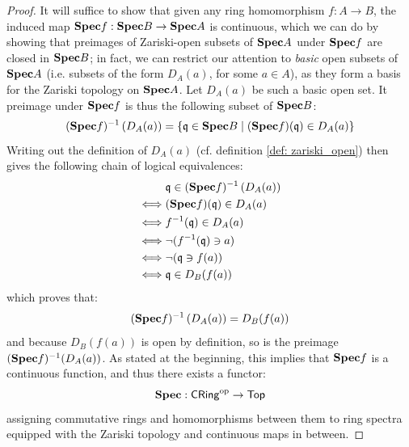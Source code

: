                    \begin{proof}
                        It will suffice to show that given any ring homomorphism $f: A \to B$, the induced map $\mathbf{Spec} f: \mathbf{Spec} B \to \mathbf{Spec} A$ is continuous, which we can do by showing that preimages of Zariski-open subsets of $\mathbf{Spec} A$ under $\mathbf{Spec} f$ are closed in $\mathbf{Spec} B$; in fact, we can restrict our attention to \textit{basic} open subsets of $\mathbf{Spec} A$ (i.e. subsets of the form $D_A(a)$, for some $a \in A$), as they form a basis for the Zariski topology on $\mathbf{Spec} A$. Let $D_A(a)$ be such a basic open set. It preimage under $\mathbf{Spec} f$ is thus the following subset of $\mathbf{Spec} B$:
                            $$(\mathbf{Spec} f)^{-1}\left(D_A(a)\right) = \{\mathfrak{q} \in \mathbf{Spec} B \mid (\mathbf{Spec} f)(\mathfrak{q}) \in D_A(a)\}$$
                        Writing out the definition of $D_A(a)$ (cf. definition \ref{def: zariski_open}) then gives the following chain of logical equivalences:
                            $$
                                \begin{aligned}
                                    & \mathfrak{q} \in (\mathbf{Spec} f)^{-1}\left(D_A(a)\right)
                                    \\
                                    \iff & (\mathbf{Spec} f)(\mathfrak{q}) \in D_A(a)
                                    \\
                                    \iff & f^{-1}(\mathfrak{q}) \in D_A(a)
                                    \\
                                    \iff & \neg(f^{-1}(\mathfrak{q}) \ni a)
                                    \\
                                    \iff & \neg(\mathfrak{q} \ni f(a))
                                    \\
                                    \iff & \mathfrak{q} \in D_B(f(a))
                                \end{aligned}
                            $$
                        which proves that:
                            $$(\mathbf{Spec} f)^{-1}\left(D_A(a)\right) = D_B(f(a))$$
                        and because $D_B(f(a))$ is open by definition, so is the preimage $(\mathbf{Spec} f)^{-1}(D_A(a))$. As stated at the beginning, this implies that $\mathbf{Spec} f$ is a continuous function, and thus there exists a functor:
                            $$\mathbf{Spec}: \mathsf{CRing}^{\mathrm{op}} \to \mathsf{Top}$$
                        assigning commutative rings and homomorphisms between them to ring spectra equipped with the Zariski topology and continuous maps in between.
                    \end{proof}
                    
